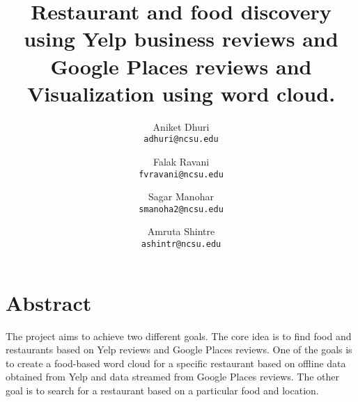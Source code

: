 \documentclass[10pt]{report}
\author{
	Aniket Dhuri\\
	\texttt{adhuri@ncsu.edu}
	\and
	Falak Ravani\\
	\texttt{fvravani@ncsu.edu}
	\and
	Sagar Manohar\\
	\texttt{smanoha2@ncsu.edu}
	\and
	Amruta Shintre\\
	\texttt{ashintr@ncsu.edu}		
}
\title{Restaurant and food discovery using Yelp business reviews and Google Places reviews and Visualization using word cloud.}
\date{}
\begin{document}
	\maketitle
	
	\section{Abstract}

The project aims to achieve two different goals. The core idea is to find food and restaurants based on Yelp reviews and Google Places reviews. One of the goals is to create a food-based word cloud for a specific restaurant based on offline data obtained from Yelp and data streamed from Google Places reviews. The other goal is to search for a restaurant based on a particular food and location.
 
 
\end{document}
